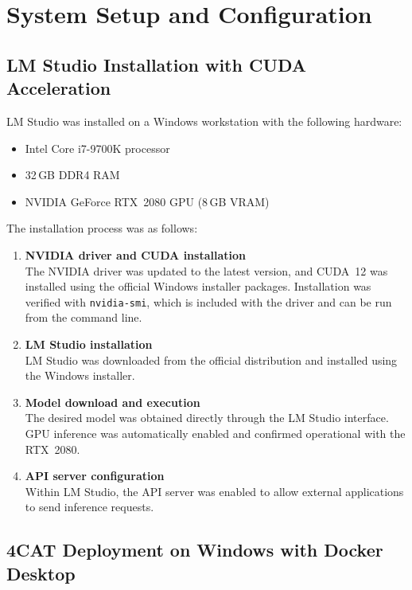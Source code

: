 \section{System Setup and Configuration}

\subsection{LM Studio Installation with CUDA Acceleration}

LM Studio was installed on a Windows workstation with the following hardware:

\begin{itemize}
    \item Intel Core i7-9700K processor
    \item 32\,GB DDR4 RAM
    \item NVIDIA GeForce RTX~2080 GPU (8\,GB VRAM)
\end{itemize}

The installation process was as follows:

\begin{enumerate}
    \item \textbf{NVIDIA driver and CUDA installation} \\
    The NVIDIA driver was updated to the latest version, and CUDA~12 was installed using the official Windows installer packages. 
    Installation was verified with \texttt{nvidia-smi}, which is included with the driver and can be run from the command line.

    \item \textbf{LM Studio installation} \\
    LM Studio was downloaded from the official distribution and installed using the Windows installer.

    \item \textbf{Model download and execution} \\
    The desired model was obtained directly through the LM Studio interface. 
    GPU inference was automatically enabled and confirmed operational with the RTX~2080.

    \item \textbf{API server configuration} \\
    Within LM Studio, the API server was enabled to allow external applications to send inference requests.
\end{enumerate}

\subsection{4CAT Deployment on Windows with Docker Desktop}


